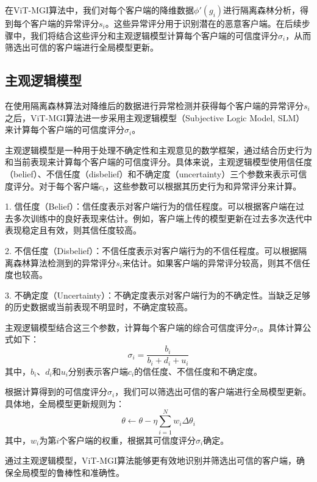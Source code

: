\documentclass[conference]{IEEEtran}
\begin{document}
在ViT-MGI算法中，我们对每个客户端的降维数据$\phi'(g_i)$进行隔离森林分析，得到每个客户端的异常评分$s_i$。这些异常评分用于识别潜在的恶意客户端。在后续步骤中，我们将结合这些评分和主观逻辑模型计算每个客户端的可信度评分$\sigma_i$，从而筛选出可信的客户端进行全局模型更新。

\subsection{主观逻辑模型}
\label{sec:method_subjective}

在使用隔离森林算法对降维后的数据进行异常检测并获得每个客户端的异常评分$s_i$之后，ViT-MGI算法进一步采用主观逻辑模型（Subjective Logic Model, SLM）来计算每个客户端的可信度评分$\sigma_i$。

主观逻辑模型是一种用于处理不确定性和主观意见的数学框架，通过结合历史行为和当前表现来计算每个客户端的可信度评分。具体来说，主观逻辑模型使用信任度（belief）、不信任度（disbelief）和不确定度（uncertainty）三个参数来表示可信度评分。对于每个客户端$c_i$，这些参数可以根据其历史行为和异常评分来计算。

1. 信任度（Belief）：信任度表示对客户端行为的信任程度。可以根据客户端在过去多次训练中的良好表现来估计。例如，客户端上传的模型更新在过去多次迭代中表现稳定且有效，则其信任度较高。

2. 不信任度（Disbelief）：不信任度表示对客户端行为的不信任程度。可以根据隔离森林算法检测到的异常评分$s_i$来估计。如果客户端的异常评分较高，则其不信任度也较高。

3. 不确定度（Uncertainty）：不确定度表示对客户端行为的不确定性。当缺乏足够的历史数据或当前表现不明显时，不确定度较高。

主观逻辑模型结合这三个参数，计算每个客户端的综合可信度评分$\sigma_i$。具体计算公式如下：
\[
\sigma_i = \frac{b_i}{b_i + d_i + u_i}
\]
其中，$b_i$、$d_i$和$u_i$分别表示客户端$c_i$的信任度、不信任度和不确定度。

根据计算得到的可信度评分$\sigma_i$，我们可以筛选出可信的客户端进行全局模型更新。具体地，全局模型更新规则为：
\[
\theta \leftarrow \theta - \eta \sum_{i=1}^N w_i \Delta \theta_i
\]
其中，$w_i$为第$i$个客户端的权重，根据其可信度评分$\sigma_i$确定。

通过主观逻辑模型，ViT-MGI算法能够更有效地识别并筛选出可信的客户端，确保全局模型的鲁棒性和准确性。
\end{document}
